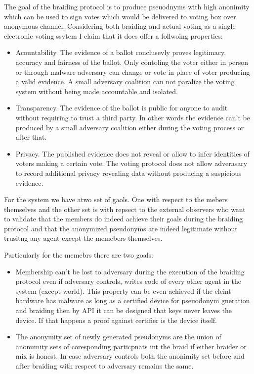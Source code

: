 \documentclass[12pt]{article}
\begin{document}
The goal of the braiding protocol is to produce pseuodnyms with high anonimity which can be used to sign votes which would be delivered to voting box over anonymous channel. Considering both braiding and actual voting as a single electronic voting ssytem I claim that it does offer a follwoing properties:

\begin{itemize}
\item Acountability. The evidence of a ballot conclusevly proves legitimacy, accuracy and fairness of the ballot. Only contoling the voter either in person or through malware adversary can change or vote in place of voter producing a valid evidence. A small adversary coalition can not paralize the voting system without being made accountable and isolated. 
  
\item Transparency. The evidence of the ballot is public for anyone to audit without requiring to trust a third party. In other words the evidence can't be produced by a small adversary coalition either during the voting process or after that. 
  
\item Privacy. The published evidence does not reveal or allow to infer identities of voters making a certain vote. The voting protocol does not allow adverasary to record additional privacy revealing data without producing a suspicious evidence.
\end{itemize}


For the system we have atwo set of gaols. One with respect to the mebers themselves and the other set is with repsect to the external observers who want to validate that the members do indeed achieve their goals during the braiding protocol and that the anonymized pseudonyms are indeed legitimate without trusitng any agent except the memebers themselves. 

Particularly for the memebrs there are two goals:
\begin{itemize}
\item Membership can't be lost to adversary during the execution of the braiding protocol even if adversary controls, writes code of every other agent in the system (except world). This property can be even achieved if the cleint hardware has malware as long as a certified device for pseuodonym gneration and braiding then by API it can be designed that keys never leaves the device. If that happens a proof against certifier is the device itself.
\item The anonymity set of newly generated pseudonyms are the union of anonumity sets of coresponding particpnats int the braid if either braider or mix is honest. In case adversary controls both the anonimity set before and after braiding with respect to adversary remains the same. 
\end{itemize}
\end{document}
